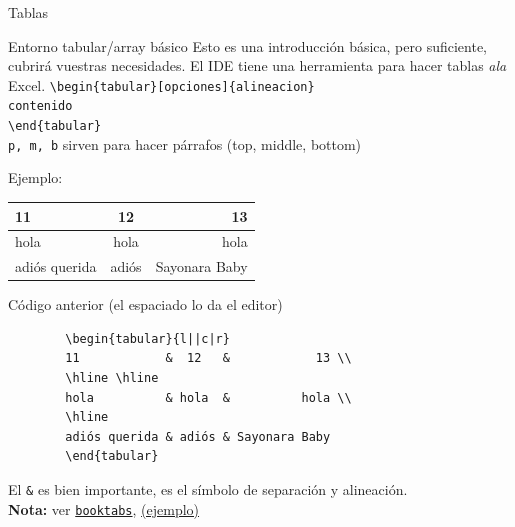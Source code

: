\documentclass[12pt]{beamer}
\begin{document}
\begin{frame}{Tablas}
		\begin{block}{Entorno tabular/array básico}
		Esto es una introducción básica, pero suficiente, cubrirá vuestras necesidades. El IDE tiene una herramienta para hacer tablas \textit{ala} Excel.
		\verb|\begin{tabular}[opciones]{alineacion}|\\
		\texttt{contenido}\\
		\verb|\end{tabular}|\\
		
		\texttt{p, m, b} sirven para hacer párrafos (top, middle, bottom)
	\end{block}
	Ejemplo: 
	\begin{tabular}{l||c|r}
		11            &  12   &            13 \\
		\hline\hline
		hola          & hola  &          hola \\
		\hline
		adiós querida & adiós & Sayonara Baby
	\end{tabular}
	\begin{block}{Código anterior (el espaciado lo da el editor)}
		\vspace*{-1em}\begin{verbatim}
		\begin{tabular}{l||c|r}
		11            &  12   &            13 \\
		\hline \hline
		hola          & hola  &          hola \\
		\hline
		adiós querida & adiós & Sayonara Baby
		\end{tabular}
		\end{verbatim}\vspace*{-1em}
	\end{block}
	El \texttt{\&} es bien importante, es el símbolo de separación y alineación. \\
	\textbf{Nota:} ver \href{https://www.ctan.org/pkg/booktabs/}{\texttt{booktabs}}, \href{https://tex.stackexchange.com/questions/163061/help-with-a-booktabs-table}{(ejemplo)}
\end{frame}
\end{document}
